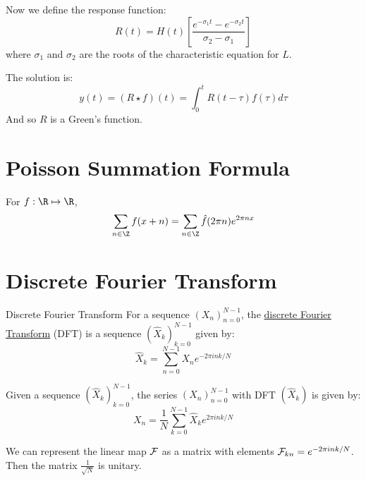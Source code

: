 \documentclass[../Main.tex]{subfiles}
\begin{document}
Now we define the response function:
\begin{equation*}
    R(t) = H(t) \left[\frac{e^{-\sigma_1 t} - e^{-\sigma_2 t}}{\sigma_2 - \sigma_1}\right]
\end{equation*}
where $\sigma_1$ and $\sigma_2$ are the roots of the characteristic equation for $L$.

The solution is:
\begin{equation*}
    y(t) = (R \star f)(t) = \int_{0}^{t} R(t - \tau)f(\tau) d\tau 
\end{equation*}
And so $R$ is a Green's function.
\section{Poisson Summation Formula}
\begin{proposition}
    For $f : \R\mapsto\R$,
    \begin{equation*}
        \sum_{n \in \Z} f(x + n) = \sum_{n \in \Z} \hat{f}(2\pi n)e^{2\pi n x}
    \end{equation*}
    \label{propPoissonSummation}
\end{proposition}
\section{Discrete Fourier Transform}
\begin{definition}{Discrete Fourier Transform}
    For a sequence $(X_n)_{n = 0}^{N - 1}$, the \underline{discrete Fourier Transform} (DFT) is a sequence $(\hat{X}_k)_{k=0}^{N - 1}$ given by:
    \begin{equation*}
        \hat{X}_k = \sum_{n=0}^{N-1} X_n e^{-2\pi i n k / N}
    \end{equation*}
\end{definition}
\begin{proposition}
    Given a sequence $(\hat{X}_k)_{k = 0}^{N - 1}$, the series $(X_n)_{n = 0}^{N - 1}$ with DFT $(\hat{X}_k)$ is given by:
    \begin{equation*}
        X_n = \frac{1}{N} \sum_{k=0}^{N-1} \hat{X}_k e^{2\pi i n k / N}
    \end{equation*}
    \label{propDiscreteFTInverse}
\end{proposition}
We can represent the linear map $\mathcal{F}$ as a matrix with elements $\mathcal{F}_{kn} = e^{-2\pi i n k / N}$. Then the matrix $\frac{1}{\sqrt{N}}$ is unitary.
\end{document}

